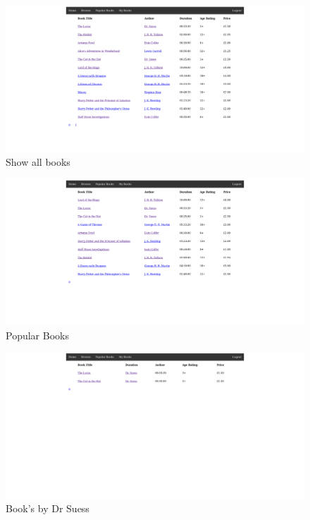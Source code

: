 \documentclass{article}
\begin{document}
\begin{figure}[!htb]
  \caption{Show all books}
  \center
  \includegraphics[scale=0.19]{image/browse.png}
\end{figure}

\begin{figure}[!htb]
  \caption{Popular Books}
  \center
  \includegraphics[scale=0.19]{image/popular.png}
\end{figure}

\begin{figure}[!htb]
  \caption{Book's by Dr Suess}
  \center
  \includegraphics[scale=0.19]{image/author.png}
\end{figure}
\end{document}
